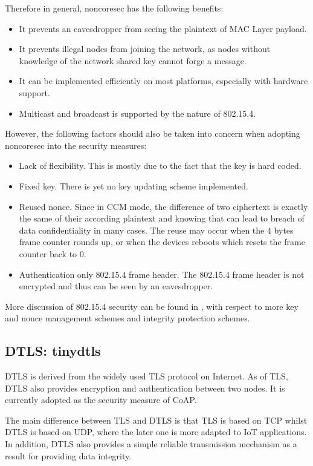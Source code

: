Therefore in general, noncoresec has the following benefits:
\begin{itemize}
\item It prevents an eavesdropper from seeing the plaintext of MAC Layer payload.
\item It prevents illegal nodes from joining the network, as nodes without knowledge of the network shared key cannot forge a message.
\item It can be implemented efficiently on most platforms, especially with hardware support.
\item Multicast and broadcast is supported by the nature of 802.15.4.
\end{itemize}

However, the following factors should also be taken into concern when adopting noncoresec into the security measures:
\begin{itemize}
\item Lack of flexibility. This is mostly due to the fact that the key is hard coded.
\item Fixed key. There is yet no key updating scheme implemented. 
\item Reused nonce. Since in CCM mode, the difference of two ciphertext is exactly the same of their according plaintext and knowing that can lead to breach of data confidentiality in many cases. The reuse may occur when the 4 bytes frame counter rounds up, or when the devices reboots which resets the frame counter back to $0$.
\item Authentication only 802.15.4 frame header. The 802.15.4 frame header is not encrypted and thus can be seen by an eavesdropper.
\end{itemize}

More discussion of 802.15.4 security can be found in \cite{802154sec}, with respect to more key and nonce management schemes and integrity protection schemes.

\subsection{DTLS: tinydtls}
DTLS is derived from the widely used TLS protocol on Internet. As of TLS, DTLS also provides encryption and authentication between two nodes. It is currently adopted as the security measure of CoAP.

The main difference between TLS and DTLS is that TLS is based on TCP whilst DTLS is based on UDP, where the later one is more adapted to IoT applications. In addition, DTLS also provides a simple reliable transmission mechanism as a result for providing data integrity.

